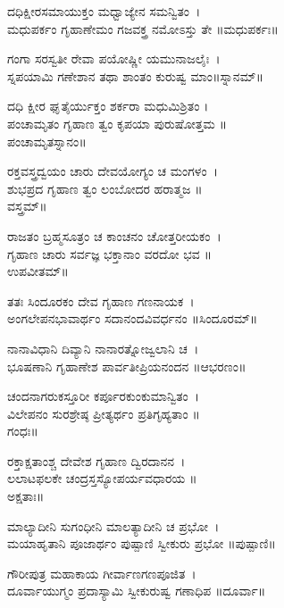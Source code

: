 ದಧಿಕ್ಷೀರಸಮಾಯುಕ್ತಂ ಮಧ್ವಾಜ್ಯೇನ ಸಮನ್ವಿತಂ~।\\
ಮಧುಪರ್ಕಂ ಗೃಹಾಣೇಮಂ ಗಜವಕ್ತ್ರ ನಮೋಽಸ್ತು ತೇ ॥ಮಧುಪರ್ಕಃ॥

ಗಂಗಾ ಸರಸ್ವತೀ ರೇವಾ ಪಯೋಷ್ಣೀ ಯಮುನಾಜಲೈಃ~।\\
ಸ್ನಪಯಾಮಿ ಗಣೇಶಾನ ತಥಾ ಶಾಂತಂ ಕುರುಷ್ವ ಮಾಂ॥ಸ್ನಾನಮ್॥

ದಧಿ ಕ್ಷೀರ ಘೃತೈರ್ಯುಕ್ತಂ ಶರ್ಕರಾ ಮಧುಮಿಶ್ರಿತಂ ।\\
ಪಂಚಾಮೃತಂ ಗೃಹಾಣ ತ್ವಂ ಕೃಪಯಾ ಪುರುಷೋತ್ತಮ ॥\\ಪಂಚಾಮೃತಸ್ನಾನಂ॥

ರಕ್ತವಸ್ತ್ರದ್ವಯಂ ಚಾರು ದೇವಯೋಗ್ಯಂ ಚ ಮಂಗಳಂ~।\\
ಶುಭಪ್ರದ ಗೃಹಾಣ ತ್ವಂ ಲಂಬೋದರ ಹರಾತ್ಮಜ ॥\\
ವಸ್ತ್ರಮ್॥

ರಾಜತಂ ಬ್ರಹ್ಮಸೂತ್ರಂ ಚ ಕಾಂಚನಂ ಚೋತ್ತರೀಯಕಂ~।\\
ಗೃಹಾಣ ಚಾರು ಸರ್ವಜ್ಞ ಭಕ್ತಾನಾಂ ವರದೋ ಭವ ॥\\
ಉಪವೀತಮ್॥

ತತಃ ಸಿಂದೂರಕಂ ದೇವ ಗೃಹಾಣ ಗಣನಾಯಕ~।\\
ಅಂಗಲೇಪನಭಾವಾರ್ಥಂ ಸದಾನಂದವಿವರ್ಧನಂ ॥ಸಿಂದೂರಮ್॥

ನಾನಾವಿಧಾನಿ ದಿವ್ಯಾನಿ ನಾನಾರತ್ನೋಜ್ವಲಾನಿ ಚ~।\\
ಭೂಷಣಾನಿ ಗೃಹಾಣೇಶ ಪಾರ್ವತೀಪ್ರಿಯನಂದನ ॥ಆಭರಣಂ॥

ಚಂದನಾಗರುಕಸ್ತೂರೀ ಕರ್ಪೂರಕುಂಕುಮಾನ್ವಿತಂ~।\\
ವಿಲೇಪನಂ ಸುರಶ್ರೇಷ್ಠ ಪ್ರೀತ್ಯರ್ಥಂ ಪ್ರತಿಗೃಹ್ಯತಾಂ ॥\\
ಗಂಧಃ॥

ರಕ್ತಾಕ್ಷತಾಂಶ್ಚ ದೇವೇಶ ಗೃಹಾಣ ದ್ವಿರದಾನನ~।\\
ಲಲಾಟಫಲಕೇ ಚಂದ್ರಸ್ತಸ್ಯೋಪರ್ಯವಧಾರಯ ॥\\
ಅಕ್ಷತಾಃ॥


ಮಾಲ್ಯಾದೀನಿ ಸುಗಂಧೀನಿ ಮಾಲತ್ಯಾದೀನಿ ಚ ಪ್ರಭೋ~।\\
ಮಯಾಹೃತಾನಿ ಪೂಜಾರ್ಥಂ ಪುಷ್ಪಾಣಿ ಸ್ವೀಕುರು ಪ್ರಭೋ ॥ಪುಷ್ಪಾಣಿ॥

ಗೌರೀಪುತ್ರ ಮಹಾಕಾಯ ಗೀರ್ವಾಣಗಣಪೂಜಿತ~।\\
ದೂರ್ವಾಯುಗ್ಮಂ ಪ್ರದಾಸ್ಯಾಮಿ ಸ್ವೀಕುರುಷ್ವ ಗಣಾಧಿಪ ॥ದೂರ್ವಾ॥

